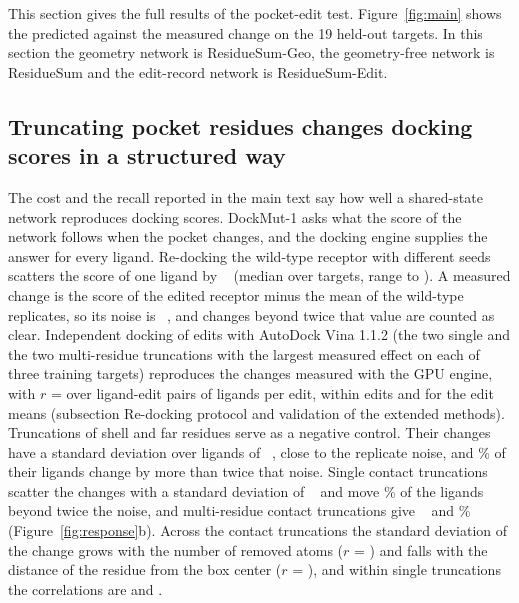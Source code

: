 This section gives the full results of the pocket-edit test. Figure~\ref{fig:main} shows the predicted against the measured change on the 19 held-out targets. In this section the geometry network is ResidueSum-Geo, the geometry-free network is ResidueSum and the edit-record network is ResidueSum-Edit.

\subsection{Truncating pocket residues changes docking scores in a structured way}

The cost and the recall reported in the main text say how well a shared-state network reproduces docking scores. DockMut-1 asks what the score of the network follows when the pocket changes, and the docking engine supplies the answer for every ligand. Re-docking the wild-type receptor with different seeds scatters the score of one ligand by \sigmaMed{}~\kcal{} (median over \nTargets{} targets, range \sigmaMin{} to \sigmaMax{}). A measured change is the score of the edited receptor minus the mean of the wild-type replicates, so its noise is \dsigmaMed{}~\kcal{}, and changes beyond twice that value are counted as clear. Independent docking of \vinaEdits{} edits with AutoDock Vina 1.1.2 (the two single and the two multi-residue truncations with the largest measured effect on each of three training targets) reproduces the changes measured with the GPU engine, with $r$ = \vinaR{} over \vinaN{} ligand-edit pairs of \vinaLigPerEdit{} ligands per edit, \vinaWithinR{} within edits and \vinaEditR{} for the edit means (subsection Re-docking protocol and validation of the extended methods). Truncations of shell and far residues serve as a negative control. Their changes have a standard deviation over ligands of \sdNull{}~\kcal{}, close to the replicate noise, and \fracNull{}\% of their ligands change by more than twice that noise. Single contact truncations scatter the changes with a standard deviation of \sdSingle{}~\kcal{} and move \fracSingle{}\% of the ligands beyond twice the noise, and multi-residue contact truncations give \sdMulti{}~\kcal{} and \fracMulti{}\% (Figure~\ref{fig:response}b). Across the \nContactEdits{} contact truncations the standard deviation of the change grows with the number of removed atoms ($r$ = \rNremoved{}) and falls with the distance of the residue from the box center ($r$ = \rDmin{}), and within single truncations the correlations are \rNremovedSingle{} and \rDminSingle{}.

